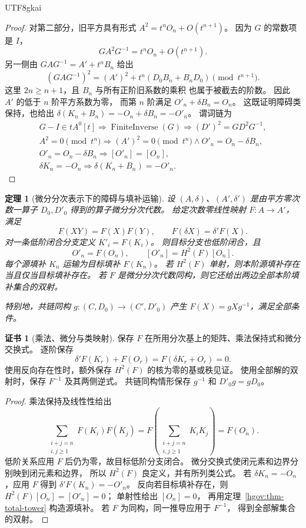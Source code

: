 \documentclass[12pt,a4paper,openany,notitlepage]{report}
\theoremstyle{plain}
\newtheorem{theorem}{定理}[chapter]
\theoremstyle{definition}
\newtheorem*{certificate}{证书}
\theoremstyle{remark}
\def\mathcal#1{#1}\def\mathsf#1{#1}\def\mathbb#1{#1}%
\begin{document}
\begin{CJK*}{UTF8}{gkai}
\begin{proof}
对第二部分，旧平方具有形式
$A^2=t^nO_n+O(t^{n+1})$。
因为 $G$ 的常数项是 $I$，
\[
 GA^2G^{-1}=t^nO_n+O(t^{n+1}).
\]
另一侧由 $GAG^{-1}=A'+t^nB_n$ 给出
\[
 (GAG^{-1})^2
 =(A')^2+t^n(D_0B_n+B_nD_0)
 \pmod{t^{n+1}}.
\]
这里 $2n\ge n+1$，且 $B_n$ 与所有正阶旧系数的乘积
也属于被截去的阶数。
因此 $A'$ 的低于 $n$ 阶平方系数为零，
而第 $n$ 阶满足 $O'_n+\delta B_n=O_n$。
这既证明障碍类保持，也给出
$\delta(K_n+B_n)=-O_n+\delta B_n=-O'_n$。
谓词链为
\[
 \begin{gathered}
 G-I\in t\mathcal A^0[t]
 \Rightarrow\operatorname{FiniteInverse}(G)
 \Rightarrow(D')^2=GD^2G^{-1},\\
 A^2=0\pmod{t^n}
 \Rightarrow(A')^2=0\pmod{t^n}
 \land O'_n=O_n-\delta B_n,\\
 O'_n=O_n-\delta B_n
 \Rightarrow[O'_n]=[O_n],\\
 \delta K_n=-O_n
 \Rightarrow\delta(K_n+B_n)=-O'_n.
 \end{gathered}
\]
\end{proof}

\begin{theorem}[微分分次表示下的障碍与填补运输]
\label{exp:hom:dg-transport}
设 $(\mathcal A,\delta)$、$(\mathcal A',\delta')$
是由平方零次数一算子 $D_0,D'_0$ 得到的算子微分分次代数。
给定次数零线性映射 $F:\mathcal A\to\mathcal A'$，满足
\[
 F(XY)=F(X)F(Y),\qquad
 F(\delta X)=\delta'F(X).
\]
对一条低阶闭合分支定义 $K'_i=F(K_i)$。
则目标分支也低阶闭合，且
\[
 O'_n=F(O_n),\qquad
 [O'_n]=H^2(F)[O_n].
\]
每个源填补 $K_n$ 运输为目标填补 $F(K_n)$。
若 $H^2(F)$ 单射，则本阶源填补存在当且仅当目标填补存在。
若 $F$ 是微分分次代数同构，则它还给出两边全部本阶填补集合的双射。

特别地，共链同构 $g:(C,D_0)\to(C',D'_0)$ 产生
$F(X)=gXg^{-1}$，满足全部条件。
\end{theorem}
\begin{certificate}[乘法、微分与类映射]
保存 $F$ 在所用分次基上的矩阵、乘法保持式和微分交换式。
逐阶保存
\[
 \delta'F(K_r)+F(O_r)=F(\delta K_r+O_r)=0.
\]
使用反向存在性时，额外保存
$H^2(F)$ 的核为零的基或秩见证。
使用全部解的双射时，保存 $F^{-1}$ 及其两侧逆式。
共链同构情形保存 $g^{-1}$ 和 $D'_0g=gD_0$。
\end{certificate}
\begin{proof}
乘法保持及线性性给出
\[
 \sum_{\substack{i+j=n\\i,j\ge1}}F(K_i)F(K_j)
 =F\left(\sum_{\substack{i+j=n\\i,j\ge1}}K_iK_j\right)
 =F(O_n).
\]
低阶关系应用 $F$ 后仍为零，故目标低阶分支闭合。
微分交换式使闭元素和边界分别映到闭元素和边界，
所以 $H^2(F)$ 良定义，并有所列类公式。
若 $\delta K_n=-O_n$，应用 $F$ 得到
$\delta'F(K_n)=-O'_n$。
反向若目标填补存在，则 $H^2(F)[O_n]=[O'_n]=0$；
单射性给出 $[O_n]=0$，
再用定理~\ref{hgov:thm-total-tower} 构造源填补。
若 $F$ 为同构，同一推导应用于 $F^{-1}$，
得到全部解集合的双射。


\end{proof}
\end{CJK*}
\end{document}
